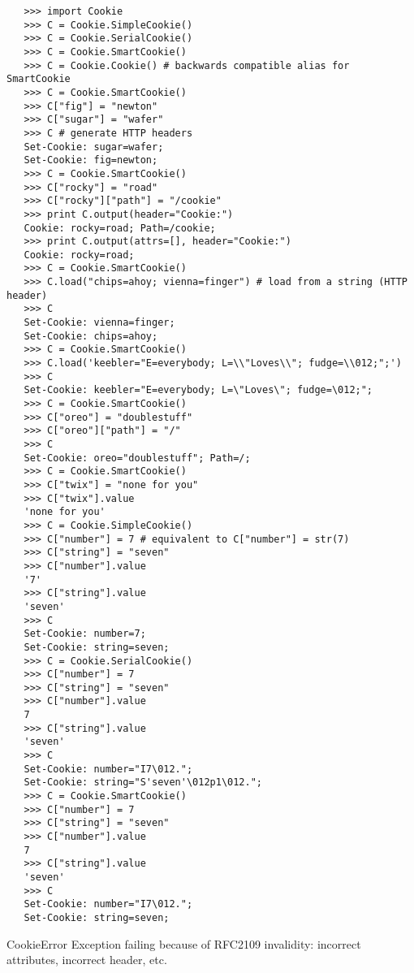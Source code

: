 \begin{verbatim}
   >>> import Cookie
   >>> C = Cookie.SimpleCookie()
   >>> C = Cookie.SerialCookie()
   >>> C = Cookie.SmartCookie()
   >>> C = Cookie.Cookie() # backwards compatible alias for SmartCookie
   >>> C = Cookie.SmartCookie()
   >>> C["fig"] = "newton"
   >>> C["sugar"] = "wafer"
   >>> C # generate HTTP headers
   Set-Cookie: sugar=wafer;
   Set-Cookie: fig=newton;
   >>> C = Cookie.SmartCookie()
   >>> C["rocky"] = "road"
   >>> C["rocky"]["path"] = "/cookie"
   >>> print C.output(header="Cookie:")
   Cookie: rocky=road; Path=/cookie;
   >>> print C.output(attrs=[], header="Cookie:")
   Cookie: rocky=road;
   >>> C = Cookie.SmartCookie()
   >>> C.load("chips=ahoy; vienna=finger") # load from a string (HTTP header)
   >>> C
   Set-Cookie: vienna=finger;
   Set-Cookie: chips=ahoy;
   >>> C = Cookie.SmartCookie()
   >>> C.load('keebler="E=everybody; L=\\"Loves\\"; fudge=\\012;";')
   >>> C
   Set-Cookie: keebler="E=everybody; L=\"Loves\"; fudge=\012;";
   >>> C = Cookie.SmartCookie()
   >>> C["oreo"] = "doublestuff"
   >>> C["oreo"]["path"] = "/"
   >>> C
   Set-Cookie: oreo="doublestuff"; Path=/;
   >>> C = Cookie.SmartCookie()
   >>> C["twix"] = "none for you"
   >>> C["twix"].value
   'none for you'
   >>> C = Cookie.SimpleCookie()
   >>> C["number"] = 7 # equivalent to C["number"] = str(7)
   >>> C["string"] = "seven"
   >>> C["number"].value
   '7'
   >>> C["string"].value
   'seven'
   >>> C
   Set-Cookie: number=7;
   Set-Cookie: string=seven;
   >>> C = Cookie.SerialCookie()
   >>> C["number"] = 7
   >>> C["string"] = "seven"
   >>> C["number"].value
   7
   >>> C["string"].value
   'seven'
   >>> C
   Set-Cookie: number="I7\012.";
   Set-Cookie: string="S'seven'\012p1\012.";
   >>> C = Cookie.SmartCookie()
   >>> C["number"] = 7
   >>> C["string"] = "seven"
   >>> C["number"].value
   7
   >>> C["string"].value
   'seven'
   >>> C
   Set-Cookie: number="I7\012.";
   Set-Cookie: string=seven;
\end{verbatim}

\begin{excdesc}{CookieError}
Exception failing because of RFC2109 invalidity: incorrect attributes,
incorrect  header, etc.
\end{excdesc}



